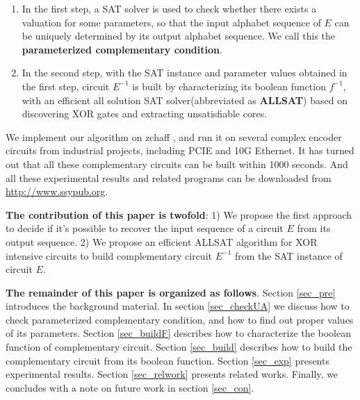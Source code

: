 \documentclass[journal]{IEEEtran}
\begin{document}
\begin{enumerate}
  \item In the first step, a SAT solver is used to check
        whether there exists a valuation for some parameters,
        so that
	the input alphabet sequence of $E$ can be uniquely determined by its output alphabet sequence.
	We call this the \textbf{parameterized complementary condition}.
  \item In the second step,
        with the SAT instance and parameter values obtained in the first step,
	circuit $E^{-1}$ is built by characterizing its boolean function $f^{-1}$,
with an efficient all solution SAT solver(abbreviated as \textbf{ALLSAT}) based on discovering XOR gates and extracting unsatisfiable cores.
\end{enumerate}

We implement our algorithm on zchaff \cite{CHAFF},
and run it on several complex encoder circuits from industrial projects,
including PCIE and 10G Ethernet.
It has turned out that all these complementary circuits can be built within 1000 seconds.
And all these experimental results and related programs can be downloaded from \url{http://www.ssypub.org}.

\textbf{The contribution of this paper is twofold}:
1) We propose the first approach to decide if it's possible to recover the input sequence of a circuit $E$ from its output sequence.
2) We propose an efficient ALLSAT algorithm for XOR intensive circuits
to build complementary circuit $E^{-1}$ from the SAT instance of circuit $E$.

\textbf{The remainder of this paper is organized as follows}.
Section \ref{sec_pre} introduces the background material.
In section \ref{sec_checkUA} we discuss how to check parameterized complementary condition,
and how to find out proper values of its parameters.
Section \ref{sec_buildF} describes how to characterize the boolean function of complementary circuit.
Section \ref{sec_build} describes how to build the complementary circuit from its boolean function.
Section \ref{sec_exp} presents experimental results.
Section \ref{sec_relwork} presents related works.
Finally,
we concludes with a note on future work in section \ref{sec_con}.

\end{document}

